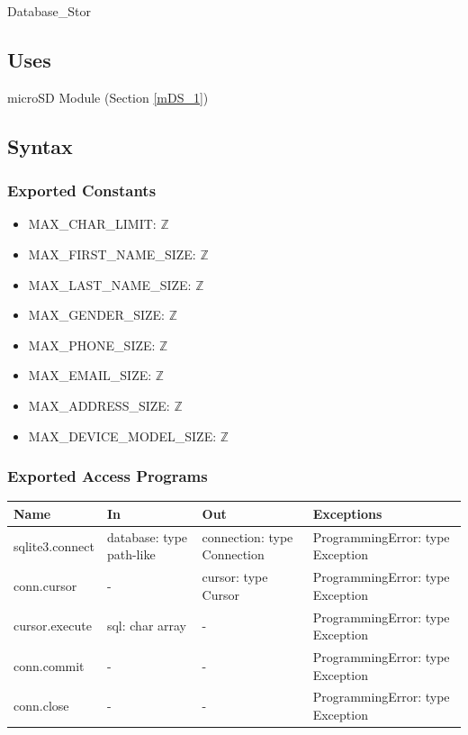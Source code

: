 \documentclass[12pt, titlepage]{article}
\begin{document}
Database\_Stor

\subsection{Uses}

microSD Module (Section \ref{mDS_1})   %

\subsection{Syntax}

\subsubsection{Exported Constants}

\begin{itemize}
\item MAX\_CHAR\_LIMIT: $\mathbb{Z}$
\item MAX\_FIRST\_NAME\_SIZE: $\mathbb{Z}$
\item MAX\_LAST\_NAME\_SIZE: $\mathbb{Z}$
\item MAX\_GENDER\_SIZE: $\mathbb{Z}$
\item MAX\_PHONE\_SIZE: $\mathbb{Z}$
\item MAX\_EMAIL\_SIZE: $\mathbb{Z}$
\item MAX\_ADDRESS\_SIZE: $\mathbb{Z}$
\item MAX\_DEVICE\_MODEL\_SIZE: $\mathbb{Z}$
\end{itemize}

\subsubsection{Exported Access Programs}

\begin{center}
\begin{tabular}{p{4cm} p{4cm} p{3.5cm} p{3.6cm}}
\hline
\textbf{Name} & \textbf{In} & \textbf{Out} & \textbf{Exceptions} \\
\hline
sqlite3.connect & database: type path-like & connection: type Connection & ProgrammingError: type Exception \\
conn.cursor & - & cursor: type Cursor & ProgrammingError: type Exception \\
cursor.execute & sql: char array & - & ProgrammingError: type Exception \\
conn.commit & - & - & ProgrammingError: type Exception \\
conn.close & - & - & ProgrammingError: type Exception \\
\hline
\end{tabular}
\end{center}
\end{document}
